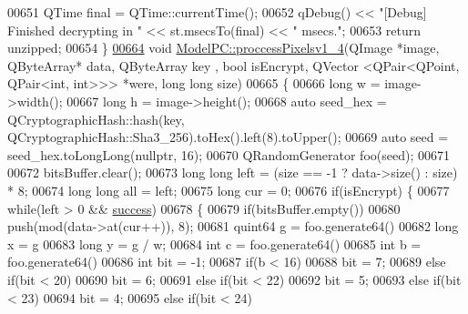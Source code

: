 \begin{DoxyCode}
00651     QTime \textcolor{keyword}{final} = QTime::currentTime();
00652     qDebug() << \textcolor{stringliteral}{"[Debug] Finished decrypting in "} << st.msecsTo(\textcolor{keyword}{final}) << \textcolor{stringliteral}{" msecs."};
00653     \textcolor{keywordflow}{return} unzipped;
00654 \}
\hypertarget{modelpc_8cpp_source.tex_l00664}{}\hyperlink{class_model_p_c_a5cdb4d1d61ff62ee9d45b496a7dbf1fb}{00664} \textcolor{keywordtype}{void} \hyperlink{class_model_p_c_a5cdb4d1d61ff62ee9d45b496a7dbf1fb}{ModelPC::proccessPixelsv1\_4}(QImage *image, QByteArray* data, QByteArray key
      , \textcolor{keywordtype}{bool} isEncrypt, QVector <QPair<QPoint, QPair<int, int>>> *were, \textcolor{keywordtype}{long} \textcolor{keywordtype}{long} size)
00665 \{
00666     \textcolor{keywordtype}{long} w = image->width();
00667     \textcolor{keywordtype}{long} h = image->height();
00668     \textcolor{keyword}{auto} seed\_hex = QCryptographicHash::hash(key, QCryptographicHash::Sha3\_256).toHex().left(8).toUpper();
00669     \textcolor{keyword}{auto} seed = seed\_hex.toLongLong(\textcolor{keyword}{nullptr}, 16);
00670     QRandomGenerator foo(seed);
00671 
00672     bitsBuffer.clear();
00673     \textcolor{keywordtype}{long} \textcolor{keywordtype}{long} left = (size == -1 ? data->size() : size) * 8;
00674     \textcolor{keywordtype}{long} \textcolor{keywordtype}{long} all = left;
00675     \textcolor{keywordtype}{long} cur = 0;
00676     \textcolor{keywordflow}{if}(isEncrypt) \{
00677         \textcolor{keywordflow}{while}(left > 0 && \hyperlink{class_model_p_c_a945ffbbc44a832b953c191debd448f4c}{success})
00678         \{
00679             \textcolor{keywordflow}{if}(bitsBuffer.empty())
00680                 push(mod(data->at(cur++)), 8);
00681             quint64 g = foo.generate64() %
00682             \textcolor{keywordtype}{long} x = g %
00683             \textcolor{keywordtype}{long} y = g / w;
00684             \textcolor{keywordtype}{int} c = foo.generate64() %
00685             \textcolor{keywordtype}{int} b = foo.generate64() %
00686             \textcolor{keywordtype}{int} bit = -1;
00687             \textcolor{keywordflow}{if}(b < 16)
00688                 bit = 7;
00689             \textcolor{keywordflow}{else} \textcolor{keywordflow}{if}(bit < 20)
00690                 bit = 6;
00691             \textcolor{keywordflow}{else} \textcolor{keywordflow}{if}(bit < 22)
00692                 bit = 5;
00693             \textcolor{keywordflow}{else} \textcolor{keywordflow}{if}(bit < 23)
00694                 bit = 4;
00695             \textcolor{keywordflow}{else} \textcolor{keywordflow}{if}(bit < 24)

\end{DoxyCode}
